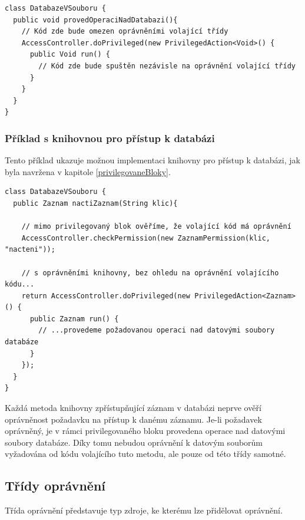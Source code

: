 \begin{verbatim}
class DatabazeVSouboru {
  public void provedOperaciNadDatabazi(){
    // Kód zde bude omezen oprávněními volající třídy
    AccessController.doPrivileged(new PrivilegedAction<Void>() {
      public Void run() {
        // Kód zde bude spuštěn nezávisle na oprávnění volající třídy
      }
    }
  }
}
\end{verbatim}

\subsubsection{Příklad s knihovnou pro přístup k databázi}\label{databazeVsouboru}

Tento příklad ukazuje možnou implementaci knihovny pro přístup k databázi, jak byla navržena v kapitole \ref{privilegovaneBloky}.

\begin{verbatim}
class DatabazeVSouboru {
  public Zaznam nactiZaznam(String klic){
    
    // mimo privilegovaný blok ověříme, že volající kód má oprávnění
    AccessController.checkPermission(new ZaznamPermission(klic, "nacteni"));
    
    // s oprávněními knihovny, bez ohledu na oprávnění volajícího kódu...
    return AccessController.doPrivileged(new PrivilegedAction<Zaznam>() {
      public Zaznam run() {
        // ...provedeme požadovanou operaci nad datovými soubory databáze
      }
    });
  }
}
\end{verbatim}

Každá metoda knihovny zpřístupňující záznam v databázi neprve ověří oprávněnost požadavku na přístup k danému záznamu.
Je-li požadavek oprávněný, je v rámci privilegovaného bloku provedena operace nad datovými soubory databáze.
Díky tomu nebudou oprávnění k datovým souborům vyžadována od kódu volajícího tuto metodu, ale pouze od této třídy samotné.

\subsection{Třídy oprávnění}

Třída oprávnění představuje typ zdroje, ke kterému lze přidělovat oprávnění.

